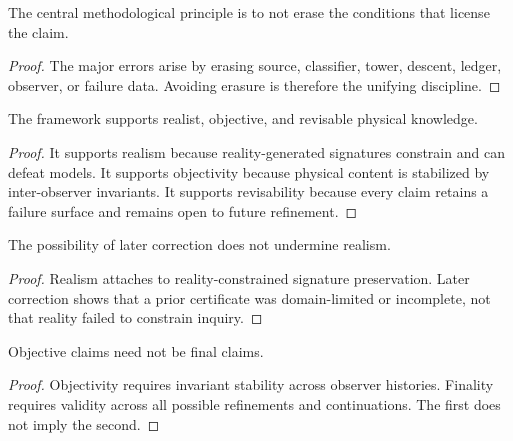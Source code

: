 \begin{corollary}
\label{cor:framework-non-erasure}
The central methodological principle is to not erase the conditions that license the claim.
\end{corollary}

\begin{proof}
The major errors arise by erasing source, classifier, tower, descent, ledger, observer, or failure data. Avoiding erasure is therefore the unifying discipline.
\end{proof}

\begin{theorem}
\label{thm:realism-objectivity-revisability-preserved}
The framework supports realist, objective, and revisable physical knowledge.
\end{theorem}

\begin{proof}
It supports realism because reality-generated signatures constrain and can defeat models. It supports objectivity because physical content is stabilized by inter-observer invariants. It supports revisability because every claim retains a failure surface and remains open to future refinement.
\end{proof}

\begin{corollary}
\label{cor:revisability-not-anti-realist}
The possibility of later correction does not undermine realism.
\end{corollary}

\begin{proof}
Realism attaches to reality-constrained signature preservation. Later correction shows that a prior certificate was domain-limited or incomplete, not that reality failed to constrain inquiry.
\end{proof}

\begin{corollary}
\label{cor:objectivity-not-finality}
Objective claims need not be final claims.
\end{corollary}

\begin{proof}
Objectivity requires invariant stability across observer histories. Finality requires validity across all possible refinements and continuations. The first does not imply the second.
\end{proof}

